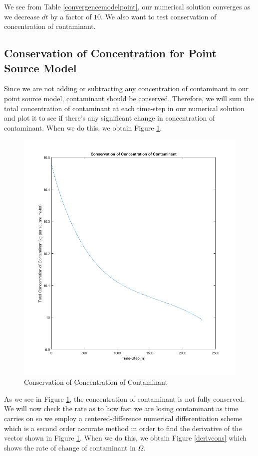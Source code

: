 \documentclass[a4paper]{article}
\theoremstyle{remark}
\theoremstyle{remark}
\begin{document}
\noindent We see from Table \ref{convergencemodelpoint}, our numerical solution converges as we decrease $dt$ by a factor of $10$. We also want to test conservation of concentration of contaminant.


\subsection{Conservation of Concentration for Point Source Model} \label{ConservationPointModelSection}
Since we are not adding or subtracting any concentration of contaminant in our point source model, contaminant should be conserved. Therefore, we will sum the total concentration of contaminant at each time-step in our numerical solution and plot it to see if there's any significant change in concentration of contaminant. When we do this, we obtain Figure \ref{conservationofconcentrationofcontaminant}.

\begin{figure}[H]   
\centering   
   \includegraphics[trim=0mm 0mm 0mm 0mm,clip,width=0.5\linewidth]{pointconservation.png}
    \caption{Conservation of Concentration of Contaminant}
    \label{conservationofconcentrationofcontaminant}
\end{figure}

As we see in Figure \ref{conservationofconcentrationofcontaminant}, the concentration of contaminant is not fully conserved. We will now check the rate as to how fast we are losing contaminant as time carries on so we employ a centered-difference numerical differentiation scheme which is a second order accurate method in order to find the derivative of the vector shown in Figure \ref{conservationofconcentrationofcontaminant}. When we do this, we obtain Figure \ref{derivcons} which shows the rate of change of contaminant in $\Omega$.
\end{document}
